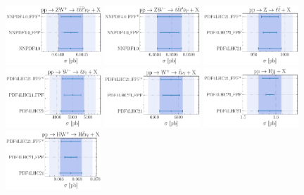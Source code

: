 \begin{figure}[htbp]
\includegraphics[width=0.32\textwidth]{plots/LHCpheno/NNPDF_WPZ_14TEV_40_PHENO-integrated.pdf}
\includegraphics[width=0.32\textwidth]{plots/LHCpheno/NNPDF_WMZ_14TEV_40_PHENO-integrated.pdf}
\includegraphics[width=0.32\textwidth]{plots/LHCpheno/NNPDF_DY_14TEV_40_PHENO-integrated-pdf4lhc21.pdf}
\includegraphics[width=0.32\textwidth]{plots/LHCpheno/NNPDF_WM_14TEV_40_PHENO-integrated-pdf4lhc21.pdf}
\includegraphics[width=0.32\textwidth]{plots/LHCpheno/NNPDF_WP_14TEV_40_PHENO-integrated-pdf4lhc21.pdf}
\includegraphics[width=0.32\textwidth]{plots/LHCpheno/NNPDF_HVBF_14TEV_40_PHENO-integrated-pdf4lhc21.pdf}
\includegraphics[width=0.32\textwidth]{plots/LHCpheno/NNPDF_HWP_14TEV_40_PHENO-integrated-pdf4lhc21.pdf}

\end{figure}
